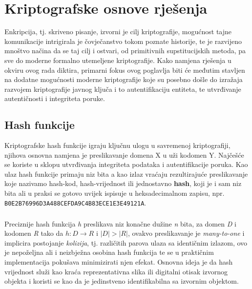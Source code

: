 \chapter{Kriptografske osnove rješenja}
Enkripcija, tj. skriveno pisanje, izvorni je cilj kriptografije\cite{ferguson2011cryptography}, mogućnost tajne komunikacije intrigirala je čovječanstvo tokom poznate historije, te je razvijeno mnoštvo načina da se taj cilj i ostvari, od primitivnih supstitucijskih metoda, pa sve do moderne formalno utemeljene kriptografije\cite{singh2000code}. Kako namjena rješenja u okviru ovog rada diktira, primarni fokus ovog poglavlja biti će međutim stavljen na dodatne mogućnosti moderne kriptografije koje su posebno došle do izražaja razvojem kriptografije javnog ključa i to autentifikaciju entiteta, te utvrđivanje autentičnosti i integriteta poruke.

\section{Hash funkcije}
Kriptografske hash funkcije igraju ključnu ulogu u savremenoj kriptografiji, njihova osnovna namjena je preslikavanje domena X u uži kodomen Y. Najčešće se koriste u sklopu utvrđivanja integriteta podataka i autentifikacije poruka. Kao ulaz hash funkcije primaju niz bita a kao izlaz vraćaju rezultirajuće preslikavanje koje nazivamo hash-kod, hash-vrijednost ili jednostavno \textbf{hash}\cite{katz1996handbook}, koji je i sam niz bita ali u praksi se gotovo uvijek ispisuje u heksadecimalnom zapisu, npr. \texttt{B0E2B76996D3A488CEFDA9C4B83ECE1E3E49121A}.

\paragraph*{}
Preciznije hash funkcija \textit{h} preslikava niz konačne dužine \textit{n} bita, za domen \textit{D} i kodomen \textit{R} tako da \(h: D \to R\) i \(|D|>|R|\), ovakvo preslikavanje je \textit{many-to-one} i implicira postojanje \textit{kolizija}, tj. različitih parova ulaza sa identičnim izlazom, ovo je nepoželjna ali i neizbježna osobina hash funkcija te se u praktičnim implementacija pokušava minimizirati njen efekat. Osnovna ideja je da hash vrijednost služi kao kraća reprezentativna slika ili digitalni otisak izvornog objekta i koristi se kao da je jedinstveno identifikabilna sa izvornim objektom.

